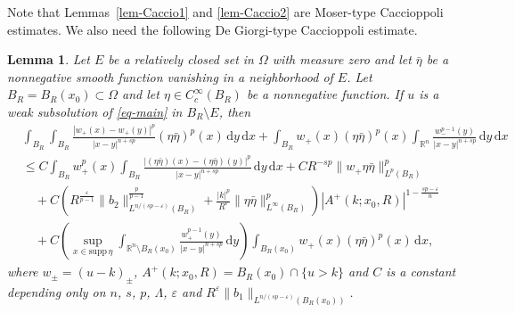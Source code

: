 \documentclass[11pt]{amsart}
\theoremstyle{plain}
\newtheorem{lemma}[theorem]{Lemma}
\theoremstyle{definition}
\numberwithin{equation}{section}
\begin{document}
Note that Lemmas~\ref{lem-Caccio1} and \ref{lem-Caccio2} are Moser-type Caccioppoli estimates. We also need the following De Giorgi-type Caccioppoli estimate.

\begin{lemma}\label{lem-Caccio3}
Let $E$ be a relatively closed set in $\Omega$ with measure zero and let $\bar{\eta}$ be a nonnegative smooth function vanishing in a neighborhood of $E$. Let $B_R=B_R(x_0)\subset \Omega$ and let $\eta \in C^\infty_c(B_R)$ be a nonnegative function. If $u$ is a weak subsolution of \eqref{eq-main} in $B_R \setminus E$, then
\begin{equation}\label{eq-Caccio3}
\begin{split}
&\int_{B_R} \int_{B_R} \frac{|w_+(x)-w_+(y)|^p}{|x-y|^{n+sp}} (\eta\bar{\eta})^p(x) \,\mathrm{d}y\,\mathrm{d}x + \int_{B_R} w_+(x) (\eta \bar{\eta})^p(x) \int_{\mathbb{R}^n} \frac{w_-^{p-1}(y)}{|x-y|^{n+sp}} \,\mathrm{d}y \,\mathrm{d}x \\
&\leq C\int_{B_R} w_+^p(x) \int_{B_R} \frac{|(\eta\bar{\eta})(x)-(\eta\bar{\eta})(y)|^p}{|x-y|^{n+sp}} \,\mathrm{d}y \,\mathrm{d}x + C R^{-sp} \|w_+\eta\bar{\eta}\|_{L^p(B_R)}^p \\
&\quad + C \left( R^{\frac{\varepsilon}{p-1}}\|b_2\|^{\frac{p}{p-1}}_{L^{n/(sp-\varepsilon)}(B_R)} + \frac{|k|^p}{R^{\varepsilon}} \|\eta\bar{\eta}\|_{L^\infty(B_R)}^p \right) |A^+(k; x_0, R)|^{1-\frac{sp-\varepsilon}{n}} \\
&\quad + C \left( \sup_{x \in \mathrm{supp} \, \eta} \int_{\mathbb{R}^n \setminus B_R(x_0)} \frac{w_+^{p-1}(y)}{|x-y|^{n+sp}} \,\mathrm{d}y \right) \int_{B_R(x_0)} w_+(x)(\eta\bar{\eta})^p(x) \,\mathrm{d}x,
\end{split}
\end{equation}
where $w_{\pm}=(u-k)_{\pm}$, $A^+(k; x_0, R)=B_R(x_0) \cap \{u>k\}$ and $C$ is a constant depending only on $n$, $s$, $p$, $\Lambda$, $\varepsilon$ and $R^\varepsilon\|b_1\|_{L^{n/(sp-\varepsilon)}(B_R(x_0))}$.
\end{lemma}
\end{document}
